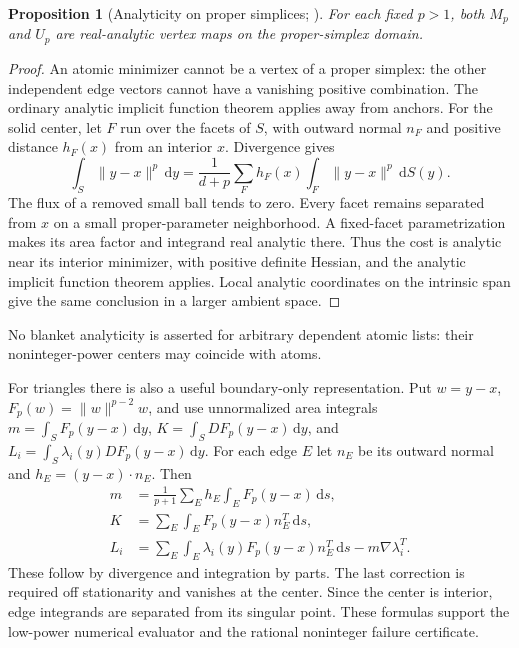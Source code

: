\documentclass[11pt]{article}
\newtheorem{proposition}[theorem]{Proposition}
\theoremstyle{definition}
\newcommand{\dd}{\,\mathrm d}
\begin{document}
\begin{proposition}[Analyticity on proper simplices; \cite{Handoff}]
For each fixed $p>1$, both $M_p$ and $U_p$ are real-analytic vertex maps
on the proper-simplex domain.
\end{proposition}
\begin{proof}
An atomic minimizer cannot be a vertex of a proper simplex: the other
independent edge vectors cannot have a vanishing positive combination.
The ordinary analytic implicit function theorem applies away from anchors.
For the solid center, let $F$ run over the facets of $S$, with outward
normal $n_F$ and positive distance $h_F(x)$ from an interior $x$. Divergence
gives
\begin{equation}\label{eq:facet}
 \int_S\|y-x\|^p\dd y=
 \frac1{d+p}\sum_F h_F(x)\int_F\|y-x\|^p\dd S(y).
\end{equation}
The flux of a removed small ball tends to zero. Every facet remains
separated from $x$ on a small proper-parameter neighborhood. A fixed-facet
parametrization makes its area factor and integrand real analytic there.
Thus the cost is analytic near its interior minimizer, with positive
definite Hessian, and the analytic implicit function theorem applies.
Local analytic coordinates on the intrinsic span give the same conclusion
in a larger ambient space.
\end{proof}
No blanket analyticity is asserted for arbitrary dependent atomic lists:
their noninteger-power centers may coincide with atoms.

For triangles there is also a useful boundary-only representation. Put
$w=y-x$, $F_p(w)=\|w\|^{p-2}w$, and use unnormalized area integrals
$m=\int_S F_p(y-x)\dd y$, $K=\int_S DF_p(y-x)\dd y$, and
$L_i=\int_S\lambda_i(y)DF_p(y-x)\dd y$. For each edge $E$ let $n_E$
be its outward normal and $h_E=(y-x)\cdot n_E$. Then
\begin{align}\label{eq:boundary}
 m&=\frac1{p+1}\sum_E h_E\int_E F_p(y-x)\dd s,\nonumber\\
 K&=\sum_E\int_E F_p(y-x)n_E^T\dd s,\\
 L_i&=\sum_E\int_E\lambda_i(y)F_p(y-x)n_E^T\dd s
                         -m\nabla\lambda_i^T.\nonumber
\end{align}
These follow by divergence and integration by parts. The last correction
is required off stationarity and vanishes at the center. Since the center
is interior, edge integrands are separated from its singular point.
These formulas support the low-power numerical evaluator and the rational
noninteger failure certificate.
\end{document}
